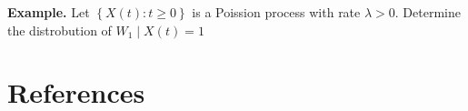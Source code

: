 \documentclass{article}
\theoremstyle{remark}
\begin{document}
\begin{tcolorbox}
  \textbf{Example.} Let $\left\{ X\left( t \right): t \ge 0 \right\}$ is a Poission process with rate $\lambda > 0$. Determine the distrobution of $W_{1}  \mid  X\left( t  \right) = 1$
\end{tcolorbox}
\section{References}
\label{sec:references}





\end{document}
